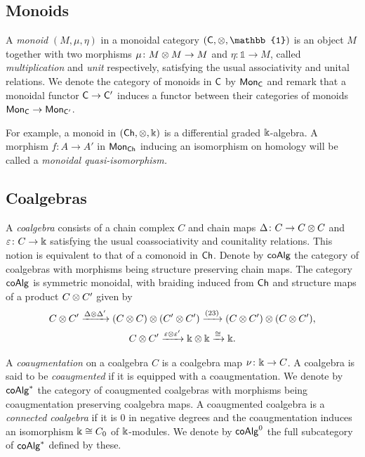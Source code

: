 \subsection{Monoids}

A \textit{monoid} $(M, \mu, \eta)$ in a monoidal category $(\sC, \ot, \mathbb{1})$ is an object $M$ together with two morphisms $\mu \colon M \otimes M \to M$ and $\eta \colon \mathbb{1} \to M$, called \textit{multiplication} and \textit{unit} respectively, satisfying the usual associativity and unital relations.
We denote the category of monoids in $\mathsf{C}$ by $\mathsf{Mon}_{\mathsf{C}}$ and remark that a monoidal functor $\mathsf{C} \to \mathsf{C}^\prime$ induces a functor between their categories of monoids $\mathsf{Mon}_{\mathsf{C}} \to \mathsf{Mon}_{\mathsf{C}^\prime}$.

For example, a monoid in $(\mathsf{Ch}, \otimes, \Bbbk)$ is a differential graded $\Bbbk$-algebra. A morphism $f: A \to A'$ in $\mathsf{Mon}_{\mathsf{Ch}}$ inducing an isomorphism on homology will be called a \textit{monoidal quasi-isomorphism.}

\subsection{Coalgebras}\label{ss:coalgebras}

A \textit{coalgebra} consists of a chain complex $C$ and chain maps $\Delta \colon C \to C \otimes C$ and $\varepsilon \colon C \to \Bbbk$ satisfying the usual coassociativity and counitality relations.
This notion is equivalent to that of a comonoid in $\mathsf{Ch}$.
Denote by $\mathsf{coAlg}$ the category of coalgebras with morphisms being structure preserving chain maps.
The category $\mathsf{coAlg}$ is symmetric monoidal, with braiding induced from $\mathsf{Ch}$ and structure maps of a product $C \otimes C^\prime$ given by
\begin{gather*}
	C \otimes C^\prime \xrightarrow{\Delta \otimes \Delta^\prime}
	(C \otimes C) \otimes (C^\prime \otimes C^\prime) \xrightarrow{(23)}
	(C \otimes C^\prime) \otimes (C \otimes C^\prime), \\
	C \otimes C^\prime \xrightarrow{\varepsilon \otimes \varepsilon^\prime}
	\Bbbk \otimes \Bbbk \xrightarrow{\cong} \Bbbk.
\end{gather*}

A \textit{coaugmentation} on a coalgebra $C$ is a coalgebra map $\nu \colon \Bbbk \to C$.
A coalgebra is said to be \textit{coaugmented} if it is equipped with a coaugmentation.
We denote by $\mathsf{coAlg}^\ast$ the category of coaugmented coalgebras with morphisms being coaugmentation preserving coalgebra maps.
A coaugmented coalgebra is a \textit{connected coalgebra} if it is $0$ in negative degrees and the coaugmentation induces an isomorphism $\Bbbk \cong C_0$ of $\Bbbk$-modules.
We denote by $\mathsf{coAlg}^0$ the full subcategory of $\mathsf{coAlg}^\ast$ defined by these.

